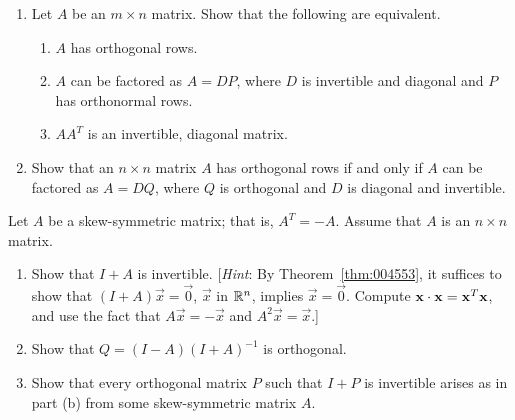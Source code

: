 \documentclass{ximera}
\begin{document}
\begin{problem}\label{prob:ortho23}
\begin{enumerate} 
\item Let $A$ be an $m \times n$ matrix. Show that the following are equivalent.


\begin{enumerate}[label={\roman*.}]
\item $A$ has orthogonal rows.

\item $A$ can be factored as $A = DP$, where $D$ is invertible and diagonal and $P$ has orthonormal rows.

\item $AA^{T}$ is an invertible, diagonal matrix.

\end{enumerate}
\item Show that an $n \times n$ matrix $A$ has orthogonal rows if and only if $A$ can be factored as $A = DQ$, where $Q$ is orthogonal and $D$ is diagonal and invertible.

\end{enumerate}
\end{problem}

\begin{problem}\label{prob:ortho24}
Let $A$ be a skew-symmetric matrix; that is, $A^{T} = -A$. Assume that $A$ is an $n \times n$ matrix.


\begin{enumerate} 
\item Show that $I + A$ is invertible. [\textit{Hint}: By Theorem~\ref{thm:004553}, it suffices to show that $(I + A)\vec{x} = \vec{0}$, $\vec{x}$ in $\mathbb{R}^n$, implies $\vec{x} = \vec{0}$. Compute $\mathbf{x} \cdot \mathbf{x} = \mathbf{x}^{T}\mathbf{x}$, and use the fact that $A\vec{x} = -\vec{x}$ and $A^{2}\vec{x} = \vec{x}$.]

\item Show that $Q = (I - A)(I + A)^{-1}$ is orthogonal.

\item Show that every orthogonal matrix $P$ such that $I + P$ is invertible arises as in part (b) from some skew-symmetric matrix $A$. \newline [\textit{Hint}: Solve $P = (I - A)(I + A)^{-1}$ for $A$.]

\end{enumerate}

\end{problem}
\end{document}
